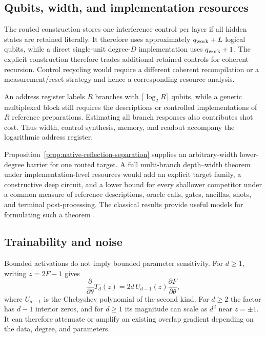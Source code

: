 \documentclass[pdflatex,sn-mathphys,NameDate,iicol]{sn-jnl}
\begin{document}
\subsection{Qubits, width, and implementation resources}

The routed construction stores one interference control per layer if all
hidden states are retained literally. It therefore uses approximately
$q_{\rm work}+L$ logical qubits, while a direct single-unit degree-$D$
implementation uses $q_{\rm work}+1$. The explicit construction therefore
trades additional retained controls for coherent recursion. Control recycling
would require a different coherent recompilation or a measurement/reset
strategy and hence a corresponding resource analysis.

An address register labels $R$ branches with $\lceil\log_2R\rceil$ qubits,
while a generic multiplexed block still requires the descriptions or
controlled implementations of $R$ reference preparations. Estimating all
branch responses also contributes shot cost. Thus width, control synthesis,
memory, and readout accompany the logarithmic address register.

Proposition~\ref{prop:native-reflection-separation} supplies an
arbitrary-width lower-degree barrier for one routed target. A full
multi-branch depth--width theorem under implementation-level resources would
add an explicit target family, a constructive deep circuit, and a lower bound
for every shallower competitor under a common measure of reference
descriptions, oracle calls, gates, ancillas, shots, and terminal
post-processing. The classical results provide useful models for formulating
such a theorem \citep{mhaskar2016deep,telgarsky2016benefits,
eldan2016power,daniely2017depth}.

\subsection{Trainability and noise}

Bounded activations do not imply bounded parameter sensitivity. For $d\ge1$,
writing $z=2F-1$ gives
\begin{equation}
 \frac{\partial}{\partial\theta}T_d(z)
 =2d\,U_{d-1}(z)\frac{\partial F}{\partial\theta},
 \label{eq:cheb-gradient}
\end{equation}
where $U_{d-1}$ is the Chebyshev polynomial of the second kind. For $d\ge2$
the factor has $d-1$ interior zeros, and for $d\ge1$ its magnitude can scale
as $d^2$ near $z=\pm1$. It can therefore attenuate or amplify an existing
overlap gradient depending on the data, degree, and parameters.
\end{document}
